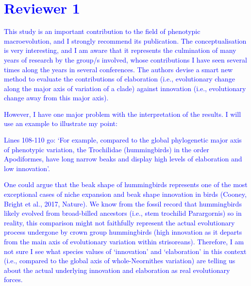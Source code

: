 \documentclass[12pt,letterpaper]{article}
\begin{document}
\section*{\textcolor{blue}{Reviewer 1}}

\textcolor{blue}{This study is an important contribution to the field of phenotypic macroevolution, and I strongly recommend its publication. The conceptualisation is very interesting, and I am aware that it represents the culmination of many years of research by the group/s involved, whose contributions I have seen several times along the years in several conferences. The authors devise a smart new method to evaluate the contributions of elaboration (i.e., evolutionary change along the major axis of variation of a clade) against innovation (i.e., evolutionary change away from this major axis).}

\textcolor{blue}{However, I have one major problem with the interpretation of the results. I will use an example to illustrate my point:}

\textcolor{blue}{Lines 108-110 go: ‘For example, compared to the global phylogenetic major axis of phenotypic variation, the Trochilidae (hummingbirds) in the order Apodiformes, have long narrow beaks and display high levels of elaboration and low innovation’.}

\textcolor{blue}{One could argue that the beak shape of hummingbirds represents one of the most exceptional cases of niche expansion and beak shape innovation in birds (Cooney, Bright et al., 2017, Nature). We know from the fossil record that hummingbirds likely evolved from broad-billed ancestors (i.e., stem trochilid Parargornis) so in reality, this comparison might not faithfully represent the actual evolutionary process undergone by crown group hummingbirds (high innovation as it departs from the main axis of evolutionary variation within strisoreans). Therefore, I am not sure I see what species values of ‘innovation’ and ‘elaboration’ in this context (i.e., compared to the global axis of whole-Neornithes variation) are telling us about the actual underlying innovation and elaboration as real evolutionary forces.}
\end{document}

